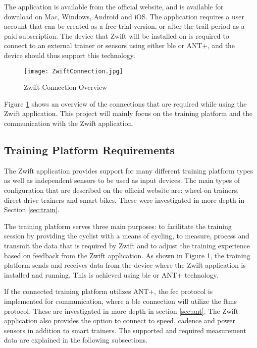 The application is available from the official website, and is available for download on Mac, Windows, Android and iOS. The application requires a user account that can be created as a free trial version, or after the trail period as a paid subscription. The device that Zwift will be installed on is required to connect to an external trainer or sensors using either \acs{ble} or ANT+, and the device should thus support this technology. \citep{Zwift:2022}

\begin{figure}[H]
	\begin{center}
		\texttt{[image: ZwiftConnection.jpg]}
		\caption{Zwift Connection Overview}
		\label{fig:zwift}
	\end{center}
\end{figure}

Figure \ref{fig:zwift} shows an overview of the connections that are required while using the Zwift application. This project will mainly focus on the training platform and the communication with the Zwift application.

\subsection{Training Platform Requirements}
The Zwift application provides support for many different training platform types as well as independent sensors to be used as input devices. The main types of configuration that are described on the official website are: wheel-on trainers, direct drive trainers and smart bikes. These were investigated in more depth in Section \ref{sec:train}.

The training platform serves three main purposes: to facilitate the training session by providing the cyclist with a means of cycling, to measure, process and transmit the data that is required by Zwift and to adjust the training experience based on feedback from the Zwift application. As shown in Figure \ref{fig:zwift}, the training platform sends and receives data from the device where the Zwift application is installed and running. This is achieved using \ac{ble} or ANT+ technology.

If the connected training platform utilizes ANT+, the \ac{fec} protocol is implemented for communication, where a \ac{ble} connection will utilize the \ac{ftms} protocol. These are investigated in more depth in section \ref{sec:ant}. The Zwift application also provides the option to connect to speed, cadence and power sensors in addition to smart trainers. The supported and required measurement data are explained in the following subsections.

